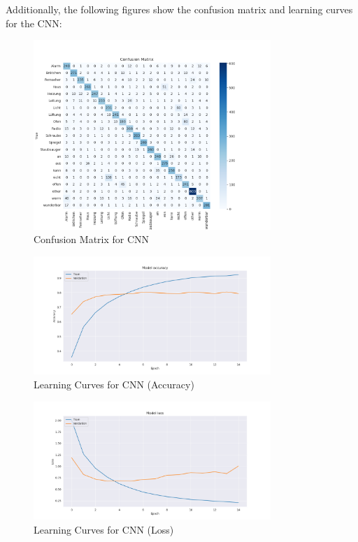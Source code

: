 Additionally, the following figures show the confusion matrix and learning curves for the CNN:
\begin{figure}[h!]
    \centering
    \includegraphics[width=0.8\textwidth]{fig/confusion_matrix.png}
    \caption{Confusion Matrix for CNN}
\end{figure}

\begin{figure}[h!]
    \centering
    \includegraphics[width=0.8\textwidth]{fig/learning_curves_accuracy.png}
    \caption{Learning Curves for CNN (Accuracy)}
\end{figure}

\begin{figure}[h!]
    \centering
    \includegraphics[width=0.8\textwidth]{fig/learning_curves_loss.png}
    \caption{Learning Curves for CNN (Loss)}
\end{figure}
